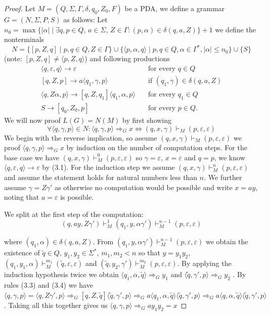 \begin{proof}
Let $M= (Q,\Sigma,\Gamma,\delta,q_0,Z_0,F) $ be a PDA, we define a grammar $G=(N,\Sigma,P,S)$
as follows: Let
$n_0 = \max \{|\alpha| \mid \exists q,p\in Q,\, a\in\Sigma,\, Z\in\Gamma: (p,\alpha) \in \delta(q,a,Z) \}+1$
we define the nonterminals
\[
  N = \{ [p, Z, q] \mid p,q\in Q, Z \in \Gamma \} \cup
   \{ \langle p, \alpha, q\rangle \mid p,q\in Q, \alpha \in \Gamma^*, |\alpha|  \le n_0 \} \cup \{S\}
\]
(note: $[p,Z,q]\neq \langle p,Z,q\rangle$) and following productions
\begin{align}
  \langle q,\varepsilon, q\rangle \to \varepsilon  \quad &\text{for every } q\in Q \\
  [q, Z, p] \to a\langle q_1,\gamma,p\rangle  \quad &\text{if } (q_1,\gamma) \in \delta(q,a,Z) \\
  \langle q, Z\alpha, p\rangle \to [q,Z,q_1]\langle q_1,\alpha,p\rangle \quad &\text{for every } q_1\in Q\\
  S \to [q_0,Z_0,p] \quad &\text{for every } p \in Q.
\end{align}
We will now proof $L(G)=N(M)$ by first showing
\[
  \forall \langle q,\gamma, p\rangle\in N :
  \langle q,\gamma, p\rangle \Rightarrow_G x \Leftrightarrow (q,x,\gamma) \vdash_M (p,\varepsilon,\varepsilon)
\]
We begin with the reverse implication, so assume $(q,x,\gamma) \vdash_M (p,\varepsilon,\varepsilon)$
we proof $\langle q,\gamma, p\rangle \Rightarrow_G x$ by induction on the number of computation steps.
For the base case we have $(q,x,\gamma) \vdash_M^0 (p,\varepsilon,\varepsilon)$
so $\gamma = \varepsilon$, $x=\varepsilon$ and $q=p$, we know $\langle q,\varepsilon, q\rangle\to\varepsilon$
by (3.1). For the induction step we assume $(q,x,\gamma) \vdash_M^n (p,\varepsilon,\varepsilon)$
and assume the statement holds for natural numbers less than $n$. We further assume $\gamma =
Z\gamma'$  as otherwise no computation would be possible and write $x=ay$, noting that $a=\varepsilon$
is possible.

We split at the first step of the computation:
\[
  (q,ay,Z\gamma') \vdash_M^1 (q_1,y,\alpha\gamma') \vdash_M^{n-1} (p,\varepsilon,\varepsilon)
\]

where $(q_1,\alpha) \in \delta(q,a,Z)$. From $(q_1,y,\alpha\gamma')
\vdash_M^{n-1} (p,\varepsilon,\varepsilon)$ we obtain the existence of
$\tilde q\in Q,\,y_1,y_2\in\Sigma^*,\, m_1,m_2<n$ so that $y=y_1y_2$,\,
$(q_1,y_1,\alpha) \vdash_M^{m_1} (\tilde q,\varepsilon,\varepsilon)$ and
$(\tilde q,y_2,\gamma') \vdash_M^{m_2} (p,\varepsilon,\varepsilon)$.
By applying the induction hypothesis twice we obtain
$\langle q_1,\alpha,\tilde q\rangle\Rightarrow_G y_1$ and $\langle\tilde q,\gamma',p\rangle\Rightarrow_G y_2$ .
By rules (3.3) and (3.4) we have
$\langle q,\gamma,p\rangle=\langle q,Z\gamma',p\rangle\Rightarrow_G [q,Z, \tilde q]\langle \tilde q,\gamma',p\rangle\Rightarrow_G
a\langle q_1,\alpha, \tilde q\rangle\langle\tilde q,\gamma',p\rangle
\Rightarrow_G a\langle q,\alpha, \tilde q\rangle\langle\tilde q,\gamma',p\rangle$.
Taking all this together
gives us $\langle q,\gamma,p \rangle\Rightarrow_G ay_1y_2=x$


\end{proof}
